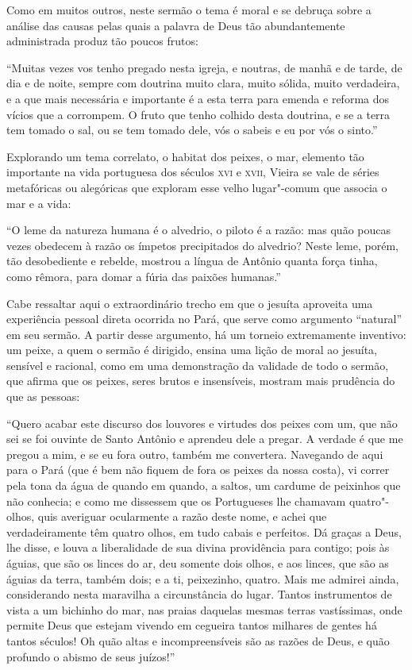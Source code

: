 Como em muitos outros, neste sermão o tema é moral e se debruça sobre a
análise das causas pelas quais a palavra de Deus tão abundantemente
administrada produz tão poucos frutos:

``Muitas vezes vos tenho pregado nesta igreja, e noutras, de manhã e de
tarde, de dia e de noite, sempre com doutrina muito clara, muito sólida,
muito verdadeira, e a que mais necessária e importante é a esta terra
para emenda e reforma dos vícios que a corrompem. O fruto que tenho
colhido desta doutrina, e se a terra tem tomado o sal, ou se tem tomado
dele, vós o sabeis e eu por vós o sinto.''

Explorando um tema correlato, o habitat dos peixes, o mar, elemento tão
importante na vida portuguesa dos séculos \textsc{xvi} e \textsc{xvii}, Vieira se vale de
séries metafóricas ou alegóricas que exploram esse velho lugar"-comum que
associa o mar e a vida:

``O leme da natureza humana é o alvedrio, o piloto é a razão: mas quão
poucas vezes obedecem à razão os ímpetos precipitados do alvedrio? Neste
leme, porém, tão desobediente e rebelde, mostrou a língua de Antônio
quanta força tinha, como rêmora, para domar a fúria das paixões
humanas.''

Cabe ressaltar aqui o extraordinário trecho em que o jesuíta aproveita
uma experiência pessoal direta ocorrida no Pará, que serve como
argumento ``natural'' em seu sermão. A partir desse argumento, há um
torneio extremamente inventivo: um peixe, a quem o sermão é dirigido,
ensina uma lição de moral ao jesuíta, sensível e racional, como em uma
demonstração da validade de todo o sermão, que afirma que os peixes,
seres brutos e insensíveis, mostram mais prudência do que as pessoas:

``Quero acabar este discurso dos louvores e virtudes dos peixes com um,
que não sei se foi ouvinte de Santo Antônio e aprendeu dele a pregar. A
verdade é que me pregou a mim, e se eu fora outro, também me convertera.
Navegando de aqui para o Pará (que é bem não fiquem de fora os peixes da
nossa costa), vi correr pela tona da água de quando em quando, a saltos,
um cardume de peixinhos que não conhecia; e como me dissessem que os
Portugueses lhe chamavam quatro"-olhos, quis averiguar ocularmente a
razão deste nome, e achei que verdadeiramente têm quatro olhos, em tudo
cabais e perfeitos. Dá graças a Deus, lhe disse, e louva a liberalidade
de sua divina providência para contigo; pois às águias, que são os
linces do ar, deu somente dois olhos, e aos linces, que são as águias da
terra, também dois; e a ti, peixezinho, quatro. Mais me admirei ainda,
considerando nesta maravilha a circunstância do lugar. Tantos
instrumentos de vista a um bichinho do mar, nas praias daquelas mesmas
terras vastíssimas, onde permite Deus que estejam vivendo em cegueira
tantos milhares de gentes há tantos séculos! Oh quão altas e
incompreensíveis são as razões de Deus, e quão profundo o abismo de seus
juízos!''

